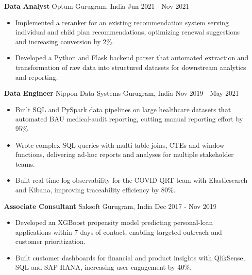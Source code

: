 \documentclass[10pt,a4paper]{article}
\newcommand{\role}[4]{\textbf{#1} \textbar{} #2 \hfill #3 \textbar{} #4\par}
\begin{document}
\vspace{3pt}
\role{Data Analyst}{Optum}{Gurugram, India}{Jun 2021 - Nov 2021}
\begin{itemize}
  \item Implemented a reranker for an existing recommendation system serving individual and child plan recommendations, optimizing renewal suggestions and increasing conversion by 2\%.
  \item Developed a Python and Flask backend parser that automated extraction and transformation of raw data into structured datasets for downstream analytics and reporting.
\end{itemize}
\vspace{3pt}
\role{Data Engineer}{Nippon Data Systems}{Gurugram, India}{Nov 2019 - May 2021}
\begin{itemize}
  \item Built SQL and PySpark data pipelines on large healthcare datasets that automated BAU medical-audit reporting, cutting manual reporting effort by 95\%.
  \item Wrote complex SQL queries with multi-table joins, CTEs and window functions, delivering ad-hoc reports and analyses for multiple stakeholder teams.
  \item Built real-time log observability for the COVID QRT team with Elasticsearch and Kibana, improving traceability efficiency by 80\%.
\end{itemize}
\vspace{3pt}
\role{Associate Consultant}{Saksoft}{Gurugram, India}{Dec 2017 - Nov 2019}
\begin{itemize}
  \item Developed an XGBoost propensity model predicting personal-loan applications within 7 days of contact, enabling targeted outreach and customer prioritization.
  \item Built customer dashboards for financial and product insights with QlikSense, SQL and SAP HANA, increasing user engagement by 40\%.
\end{itemize}
\end{document}
